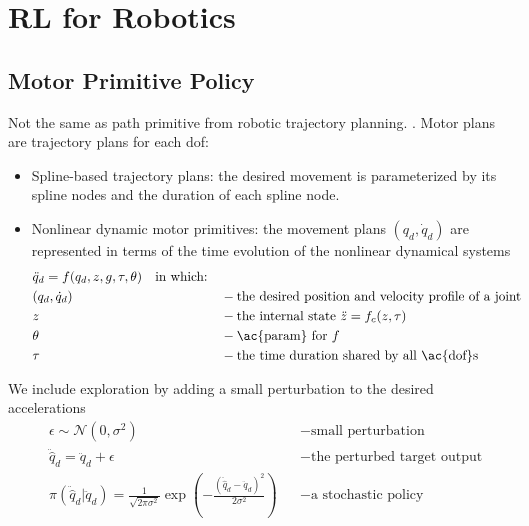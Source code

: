 \chapter{RL for Robotics}

\section{Motor Primitive Policy}
Not the same as path primitive from robotic trajectory planning. \cite{ijspeert2002movement}. Motor plans are trajectory plans for each \ac{dof}:
\begin{itemize}
	\item Spline-based trajectory plans: the desired movement is parameterized by its spline nodes and the duration of each spline node. \cite{miyamoto1995kendama, siciliano2008springer}
	\item Nonlinear dynamic motor primitives: the movement plans $(q_d, \dot{q}_d)$ are represented in terms of the time evolution of the nonlinear dynamical systems  \cite{ijspeert2002movement}
	\begin{align*}
		&\ddot{q}_d = f(q_d, z, g, \tau, \theta) \quad \text{in which:}\\
		&(q_d, \dot{q}_d) &&-\text{the desired position and velocity profile of a joint}\\
		&z &&-\text{the internal state $\ddot{z} = f_c(z,\tau)$}\\
		&\theta &&-\text{\ac{param} for $f$}\\
		&\tau &&-\text{the time duration shared by all \ac{dof}s}
	\end{align*}
\end{itemize}

We include exploration by adding a small perturbation to the desired accelerations
\begin{align}
	&\epsilon \sim \mathcal{N}(0, \sigma^2) &&-\text{small perturbation}\\
	&\ddot{\hat{q}}_d = \ddot{q}_d + \epsilon &&-\text{the perturbed target output}\\
	&\pi(\ddot{\hat{q}}_d | \ddot{q}_d) = \frac{1}{\sqrt{2\pi\sigma^2}} \exp\left( -\frac{(\ddot{\hat{q}}_d - \ddot{q}_d)^2}{2\sigma^2} \right) &&-\text{a stochastic policy}
\end{align}

